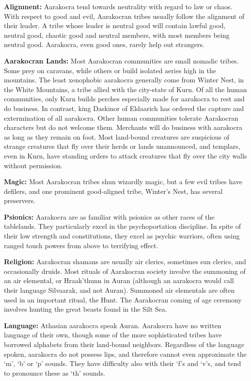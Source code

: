 \documentclass[10pt,a4paper,twocolumn]{d20}
\begin{document}
\textbf{Alignment:} Aarakocra tend towards neutrality with regard to law or chaos. With respect to good and evil, Aarakocran tribes usually follow the alignment of their leader. A tribe whose leader is neutral good will contain lawful good, neutral good, chaotic good and neutral members, with most members being neutral good. Aarakocra, even good ones, rarely help out strangers.

\textbf{Aarakocran Lands:} Most Aarakocran communities are small nomadic tribes. Some prey on caravans, while others or build isolated aeries high in the mountains. The least xenophobic aarakocra generally come from Winter Nest, in the White Mountains, a tribe allied with the city‐state of Kurn. Of all the human communities, only Kurn builds perches especially made for aarakocra to rest and do business. In contrast, king Daskinor of Eldaarich has ordered the capture and extermination of all aarakocra. Other human communities tolerate Aarakocran characters but do not welcome them. Merchants will do business with aarakocra as long as they remain on foot. Most land‐bound creatures are suspicious of strange creatures that fly over their herds or lands unannounced, and templars, even in Kurn, have standing orders to attack creatures that fly over the city walls without permission.

\textbf{Magic:} Most Aarakocran tribes shun wizardly magic, but a few evil tribes have defilers, and one prominent good‐aligned tribe, Winter’s Nest, has several preservers.

\textbf{Psionics:} Aarakocra are as familiar with psionics as other races of the tablelands. They particularly excel in the psychoportation discipline. In spite of their low strength and constitutions, they excel as psychic warriors, often using ranged touch powers from above to terrifying effect.

\textbf{Religion:} Aarakocran shamans are usually air clerics, sometimes sun clerics, and occasionally druids. Most rituals of Aarakocran society involve the summoning of an air elemental, or Hraak’thunn in Auran (although an aarakocra would call their language Silvaarak, and not Auran). Summoned air elementals are often used in an important ritual, the Hunt. The Aarakocran coming of age ceremony involves hunting the great beasts found in the Silt Sea.

\textbf{Language:} Athasian aarakocra speak Auran. Aarakocra have no written language of their own, though some of the more sophisticated tribes have borrowed alphabets from their land‐bound neighbors. Regardless of the language spoken, aarakocra do not possess lips, and therefore cannot even approximate the ‘m’, ‘b’ or ‘p’ sounds. They have difficulty also with their ‘f’s and ‘v’s, and tend to pronounce these as ‘th’ sounds.
\end{document}
